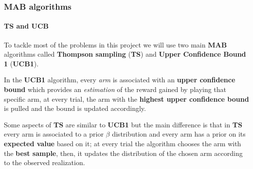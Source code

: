 
\begin{frame}

\frametitle{MAB algorithms}
\framesubtitle{TS and UCB}

\vspace*{-0.5em}
To tackle most of the problems in this project we will use two main \textbf{MAB} algorithms called \textbf{Thompson sampling} (\textbf{TS}) and \textbf{Upper Confidence Bound 1} (\textbf{UCB1}).

In the \textbf{UCB1} algorithm, every \textit{arm} is associated with an \textbf{upper confidence bound} which provides an \textit{estimation} of the reward gained by playing that specific arm, at every trial, the arm with the \textbf{highest upper confidence bound} is pulled and the bound is updated accordingly.

Some aspects of \textbf{TS} are similar to \textbf{UCB1} but the main difference is that in \textbf{TS} every arm is associated to a prior $\beta$ distribution and every arm has a prior on its \textbf{expected value} based on it; at every trial the algorithm chooses the arm with the \textbf{best sample}, then, it updates the distribution of the chosen arm according to the observed realization.

\end{frame}

